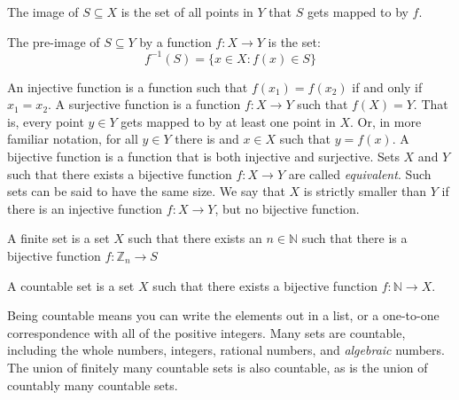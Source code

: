 \documentclass[crop=false,class=book,oneside]{standalone}
\begin{document}
            The image of $S\subseteq{X}$ is the set of all
            points in $Y$ that $S$ gets mapped to by $f$.
            \begin{definition}
                The pre-image of $S\subseteq{Y}$ by a function
                $f:X\rightarrow{Y}$ is the set:
                \begin{equation}
                    f^{-1}(S)=\{x\in{X}:f(x)\in{S}\}
                \end{equation}
            \end{definition}
            An injective function is a function such
            that $f(x_{1})=f(x_{2})$ if and only if $x_{1}=x_{2}$.
            A surjective function is a function $f:X\rightarrow{Y}$
            such that $f(X)=Y$. That is, every point $y\in{Y}$
            gets mapped to by at least one point in $X$. Or, in
            more familiar notation, for all $y\in{Y}$ there is
            and $x\in{X}$ such that $y=f(x)$. A bijective
            function is a function that is both injective and
            surjective. Sets $X$ and $Y$ such that there
            exists a bijective function $f:X\rightarrow{Y}$ are
            called \textit{equivalent}. Such sets can be said
            to have the same size. We say that $X$ is strictly
            smaller than $Y$ if there is an injective function
            $f:X\rightarrow{Y}$, but no bijective function.
            \begin{definition}
                A finite set is a set $X$ such that there
                exists an $n\in\mathbb{N}$ such that there is
                a bijective function
                $f:\mathbb{Z}_{n}\rightarrow{S}$
            \end{definition}
            \begin{definition}
                A countable set is a set
                $X$ such that there exists a bijective
                function $f:\mathbb{N}\rightarrow{X}$.
            \end{definition}
            Being countable means you can write
            the elements out in a list, or a
            one-to-one correspondence with all of
            the positive integers. Many sets are countable,
            including the whole numbers, integers, rational
            numbers, and \textit{algebraic} numbers. The
            union of finitely many countable sets is also
            countable, as is the union of countably many
            countable sets.
\end{document}
